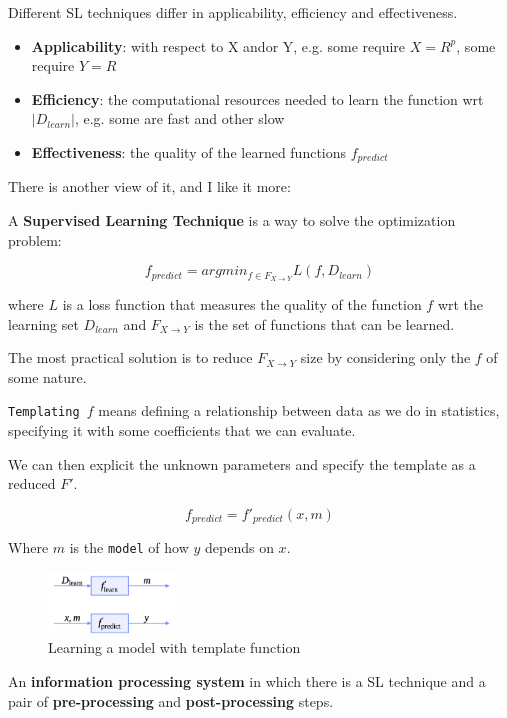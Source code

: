 Different SL techniques differ in applicability, efficiency and effectiveness.
\begin{itemize}
    \item \textbf{Applicability}: with respect to X and\/or Y, e.g. some require $X = R^{p}$, some require $Y = R$
    \item \textbf{Efficiency}: the computational resources needed to learn the function wrt $|D_{learn}|$, e.g. some are fast and other slow
    \item \textbf{Effectiveness}: the quality of the learned functions $f_{predict}$
\end{itemize}

There is another view of it, and I like it more:
\begin{definitionblock}
A \textbf{Supervised Learning Technique} is a way to solve the optimization problem:


$$f_{predict} = argmin_{f \in F_{X \to Y}} L(f, D_{learn})$$
    
where $L$ is a loss function that measures the quality of the function $f$ wrt the learning set $D_{learn}$ and $F_{X \to Y}$ is the set of functions that can be learned.
\end{definitionblock}

The most practical solution is to reduce $F_{X \to Y}$ size by considering only the $f$ of some nature.

\texttt{Templating $f$} means defining a relationship between data as we do in statistics, specifying it with some coefficients that we can evaluate.

We can then explicit the unknown parameters and specify the template as a reduced $F'$. 

$$f_{predict} = f'_{predict}(x,m)$$

Where $m$ is the \texttt{model} of how $y$ depends on $x$.

\begin{figure}[H]
    \centering
    \includegraphics[width=0.3\textwidth]{assets/fig2.png}
    \caption{Learning a model with template function}
    \label{fig:template}
\end{figure}

\begin{definitionblock}[ML system]
An \textbf{information processing system} in which there is a SL technique and a pair of \textbf{pre-processing} and \textbf{post-processing} steps.
\end{definitionblock}

